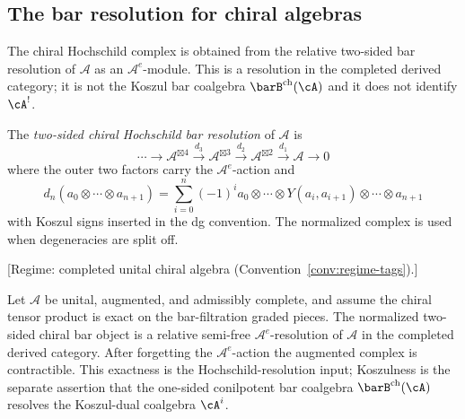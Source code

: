 \subsection{The bar resolution for chiral algebras}

The chiral Hochschild complex is obtained from the relative
two-sided bar resolution of $\mathcal{A}$ as an
$\mathcal{A}^e$-module.  This is a resolution in the completed
derived category; it is not the Koszul bar coalgebra
$\barB^{\mathrm{ch}}(\cA)$ and it does not identify
$\cA^!$.

\begin{definition}
The \emph{two-sided chiral Hochschild bar resolution} of
$\mathcal{A}$ is
\[
\cdots \to \mathcal{A}^{\boxtimes 4} \xrightarrow{d_3} \mathcal{A}^{\boxtimes 3} \xrightarrow{d_2} \mathcal{A}^{\boxtimes 2} \xrightarrow{d_1} \mathcal{A} \to 0
\]
where the outer two factors carry the $\mathcal A^e$-action and
\[
d_n(a_0 \otimes \cdots \otimes a_{n+1}) = \sum_{i=0}^n (-1)^i a_0 \otimes \cdots \otimes Y(a_i, a_{i+1}) \otimes \cdots \otimes a_{n+1}
\]
with Koszul signs inserted in the dg convention.  The normalized
complex is used when degeneracies are split off.
\end{definition}

\begin{theorem}
\label{thm:chiral-bar-resolution-exact}
\textup{[Regime: completed unital chiral algebra
\textup{(}Convention~\textup{\ref{conv:regime-tags})}.]}

Let $\mathcal A$ be unital, augmented, and admissibly complete, and
assume the chiral tensor product is exact on the bar-filtration
graded pieces.  The normalized two-sided chiral bar object is a
relative semi-free $\mathcal A^e$-resolution of $\mathcal A$ in the
completed derived category.  After forgetting the
$\mathcal A^e$-action the augmented complex is contractible.
This exactness is the Hochschild-resolution input; Koszulness is the
separate assertion that the one-sided conilpotent bar coalgebra
$\barB^{\mathrm{ch}}(\cA)$ resolves the Koszul-dual coalgebra
$\cA^i$.
\end{theorem}

